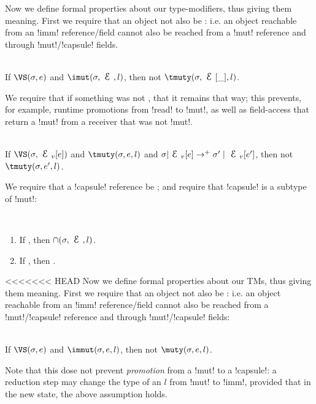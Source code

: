 \begin{Assumption}
Now we define formal properties about our type-modifiers, thus giving them meaning. First we require that an \imut object not also be \tmuty: i.e. an object reachable from an \Q!imm! reference/field cannot also be reached from a \Q!mut! reference and through \Q!mut!/\Q!capsule! fields.
\SS\begin{Assumption}\rm\ \\
\indent If $\VS(\s, e)$ and $\imut(\s, \E, l)$, then not $\tmuty(\s, \E[\_], l)$.
\end{Assumption}%

\noindent We require that if something was not \tmuty, that it remains that way; this prevents, for example, runtime promotions from \Q!read! to \Q!mut!, as well as field-access that return a \Q!mut! from a receiver that was not \Q!mut!.
\SS\begin{Assumption}\rm\ \\
\indent If $\VS(\s, \EV[e])$ and $\tmuty(\s, e, l)$ and $\s|\EV[e] \rightarrow^{+} \s'\mid\EV[e']$, then not $\tmuty(\s, e', l)$.
\end{Assumption}

\noindent We require that a \Q!capsule! reference be \cap; and require that \Q!capsule! is a subtype of \Q!mut!:
\SS\begin{Assumption}\rm\ 
\begin{enumerate}
\item If , then $\cap(\s, \E, l)$.
\item If , then .
\end{enumerate}
\end{Assumption}%

<<<<<<< HEAD
\noindent Now we define formal properties about our TMs, thus giving them meaning. First we require that an \immut object not also be \muty: i.e. an object reachable from an \Q!imm! reference/field cannot also be reached from a \Q!mut!/\Q!capsule! reference and through \Q!mut!/\Q!capsule! fields:%
\SS\begin{Assumption}[Imm Consistency]\rm\ \\
\indent If $\VS(\s, e)$ and $\immut(\s, e, l)$, then not $\muty(\s, e, l)$.

\noindent Note that this dose not prevent \emph{promotion} from a \Q!mut! to a \Q!capsule!: a reduction step may change the type of an $l$ from \Q!mut! to \Q!imm!, provided that in the new state, the above assumption holds.
\end{Assumption}


\end{Assumption}
